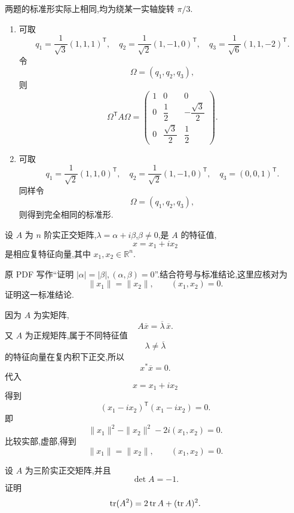 \begin{solution}
两题的标准形实际上相同,均为绕某一实轴旋转 $\pi/3$.

\begin{enumerate}
    \item 可取
    \[
    q_1=\dfrac1{\sqrt3}(1,1,1)^{\mathsf T},
    \quad
    q_2=\dfrac1{\sqrt2}(1,-1,0)^{\mathsf T},
    \quad
    q_3=\dfrac1{\sqrt6}(1,1,-2)^{\mathsf T}.
    \]
    令
    \[
    \Omega=(q_1,q_2,q_3),
    \]
    则
    \[
    \boxed{
    \Omega^{\mathsf T}A\Omega
    =
    \begin{pmatrix}
    1&0&0\\
    0&\dfrac12&-\dfrac{\sqrt3}{2}\\[3pt]
    0&\dfrac{\sqrt3}{2}&\dfrac12
    \end{pmatrix}.
    }
    \]

    \item 可取
    \[
    q_1=\dfrac1{\sqrt2}(1,1,0)^{\mathsf T},
    \quad
    q_2=\dfrac1{\sqrt2}(1,-1,0)^{\mathsf T},
    \quad
    q_3=(0,0,1)^{\mathsf T}.
    \]
    同样令
    \[
    \Omega=(q_1,q_2,q_3),
    \]
    则得到完全相同的标准形.
\end{enumerate}
\end{solution}


\begin{example}[\markstar]
设 $A$ 为 $n$ 阶实正交矩阵,$\lambda=\alpha+i\beta$,$\beta\neq0$,是 $A$ 的特征值,
\[
x=x_1+ix_2
\]
是相应复特征向量,其中 $x_1,x_2\in\mathbb{R}^n$.

原 PDF 写作``证明 $|\alpha|=|\beta|,(\alpha,\beta)=0$''.结合符号与标准结论,这里应核对为
\[
\|x_1\|=\|x_2\|,
\qquad
(x_1,x_2)=0.
\]
证明这一标准结论.
\end{example}
\exampleblank

\begin{solution}
因为 $A$ 为实矩阵,
\[
A\overline x=\overline\lambda\,\overline x.
\]
又 $A$ 为正规矩阵,属于不同特征值
\[
\lambda\neq\overline\lambda
\]
的特征向量在复内积下正交,所以
\[
x^*\overline x=0.
\]
代入
\[
x=x_1+ix_2
\]
得到
\[
(x_1-ix_2)^{\mathsf T}(x_1-ix_2)=0.
\]
即
\[
\|x_1\|^2-\|x_2\|^2-2i(x_1,x_2)=0.
\]
比较实部,虚部,得到
\[
\boxed{
\|x_1\|=\|x_2\|,
\qquad
(x_1,x_2)=0.
}
\]
\end{solution}


\begin{example}
设 $A$ 为三阶实正交矩阵,并且
\[
\det A=-1.
\]
证明
\[
\operatorname{tr}(A^2)=2\operatorname{tr} A+(\operatorname{tr} A)^2.
\]
\end{example}
\exampleblank

